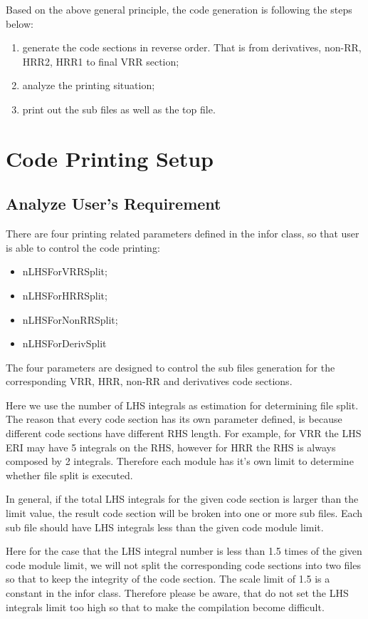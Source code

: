 Based on the above general principle, the code generation is following the 
steps below:
\begin{enumerate}
 \item generate the code sections in reverse order. That is from derivatives,
 non-RR, HRR2, HRR1 to final VRR section;
 \item analyze the printing situation;
 \item print out the sub files as well as the top file.
\end{enumerate}

\section{Code Printing Setup}

\subsection{Analyze User's Requirement}
\label{code_generation_user}

There are four printing related parameters defined in the infor class, so that
user is able to control the code printing:
\begin{itemize}
 \item nLHSForVRRSplit;
 \item nLHSForHRRSplit;
 \item nLHSForNonRRSplit;
 \item nLHSForDerivSplit
\end{itemize}
The four parameters are designed to control the sub files generation 
for the corresponding VRR, HRR, non-RR and derivatives code sections. 

Here we use the number of LHS integrals as estimation for determining file split.
The reason that every code section has its own parameter defined, is because
different code sections have different RHS length. For example, for VRR the 
LHS ERI may have 5 integrals on the RHS, however for HRR the RHS is always
composed by 2 integrals. Therefore each module has it's own limit to determine
whether file split is executed.

In general, if the total LHS integrals for the given code section is larger 
than the limit value, the result code section will be broken into one or more sub files.
Each sub file should have LHS integrals less than the given code module limit.

Here for the case that the LHS integral number is less than 1.5 times of the given
code module limit, we will not split the corresponding code sections into two files
so that to keep the integrity of the code section. The scale limit of 1.5 is a 
constant in the infor class. Therefore please be aware, that do not set the 
LHS integrals limit too high so that to make the compilation become difficult.

